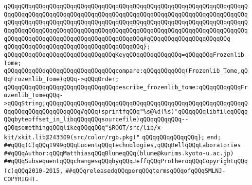 \verb|qQQqqQQqqQQqqQQqqQQqqQQqqQQqqQQqqQQqqQQqqQQqqQQqqQQqqQQqqQQqqQQqqQQqqQQqqQQqqQQqqQQqqQQqqQQqqQQqqQQqqQQqqQQqqQQqqQQqqQQqqQQqqQQqqQQqqQQqqQQqqQQqqQQqqQQqqQQqqQQqqQQqqQQqqQQqqQQqqQQqqQQqqQQqqQQqqQQqqQQqqQQqqQQqqQQqqQQqqQQqqQQqqQQqqQQqqQQqqQQqqQQqqQQqqQQqqQQqqQQqqQQqqQQqqQQqqQQqqQQqqQQqqQQqqQQqqQQqqQQqqQQqqQQqqQQqqQQqqQQq#qQQqqQQqqQQqqQQqqQQqqQQq|\newline
\verb|qQQqqQQqqQQqqQQqqQQqqQQqqQQqqQQqqQQqqQQq};|\newline
\newline
\verb|qQQqqQQqqQQqqQQqqQQqqQQqqQQqqQQqKeyqQQqqQQqqQQqqQQq=qQQqqQQqFrozenlib_Tome;|\newline
\newline
\verb|qQQqqQQqqQQqqQQqqQQqqQQqqQQqqQQqcompare:qQQqqQQqqQQq(Frozenlib_Tome,qQQqFrozenlib_Tome)qQQq->qQQqOrder;|\newline
\newline
\verb|qQQqqQQqqQQqqQQqqQQqqQQqqQQqqQQqdescribe_frozenlib_tome:qQQqqQQqqQQqFrozenlib_TomeqQQq->qQQqString;qQQqqQQqqQQqqQQqqQQqqQQqqQQqqQQqqQQqqQQqqQQqqQQqqQQqqQQqqQQqqQQqqQQqqQQqqQQqqQQq#qQQq(sprintfqQQq"%s@%d(%s)"qQQqqQQqlibfileqQQqqQQqbyteoffset_in_libqQQqqQQqsourcefile)qQQqqQQqqQQq--qQQqsomethingqQQqlikeqQQqqQQq"$ROOT/src/lib/x-kit/xkit.lib@243309(src/color/rgb.pkg)"|\newline
\verb|qQQqqQQqqQQqqQQq};|\newline
\verb|end;|\newline
\newline
\verb|##qQQq(C)qQQq1999qQQqLucentqQQqTechnologies,qQQqBellqQQqLaboratories|\newline
\verb|##qQQqAuthor:qQQqMatthiasqQQqBlumeqQQq(blume@kurims.kyoto-u.ac.jp)|\newline
\verb|##qQQqSubsequentqQQqchangesqQQqbyqQQqJeffqQQqProtheroqQQqCopyrightqQQq(c)qQQq2010-2015,|\newline
\verb|##qQQqreleasedqQQqperqQQqtermsqQQqofqQQqSMLNJ-COPYRIGHT.|\newline
\newline


